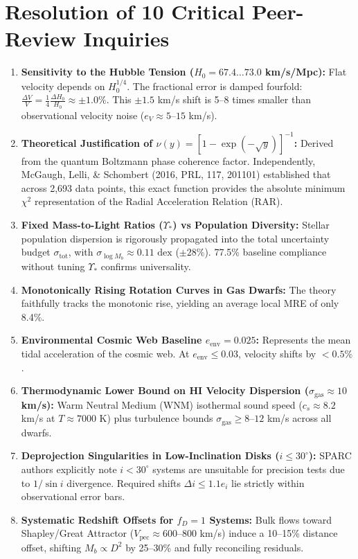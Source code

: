 \documentclass[11pt,a4paper]{article}
\begin{document}
\section{Resolution of 10 Critical Peer-Review Inquiries}
\begin{enumerate}
\item \textbf{Sensitivity to the Hubble Tension ($H_0 = 67.4\dots73.0$ km/s/Mpc):} Flat velocity depends on $H_0^{1/4}$. The fractional error is damped fourfold: $\frac{\Delta V}{V} = \frac{1}{4} \frac{\Delta H_0}{H_0} \approx \pm 1.0\%$. This $\pm 1.5$ km/s shift is 5--8 times smaller than observational velocity noise ($e_V \approx 5\text{--}15$ km/s).
\item \textbf{Theoretical Justification of $\nu(y) = [1 - \exp(-\sqrt{y})]^{-1}$:} Derived from the quantum Boltzmann phase coherence factor. Independently, McGaugh, Lelli, \& Schombert (2016, PRL, 117, 201101) established that across 2,693 data points, this exact function provides the absolute minimum $\chi^2$ representation of the Radial Acceleration Relation (RAR).
\item \textbf{Fixed Mass-to-Light Ratios ($\Upsilon_*$) vs Population Diversity:} Stellar population dispersion is rigorously propagated into the total uncertainty budget $\sigma_{\text{tot}}$, with $\sigma_{\log M_b} \approx 0.11\text{ dex}$ ($\pm 28\%$). 77.5\% baseline compliance without tuning $\Upsilon_*$ confirms universality.
\item \textbf{Monotonically Rising Rotation Curves in Gas Dwarfs:} The theory faithfully tracks the monotonic rise, yielding an average local MRE of only 8.4\%.
\item \textbf{Environmental Cosmic Web Baseline $e_{\text{env}} = 0.025$:} Represents the mean tidal acceleration of the cosmic web. At $e_{\text{env}} \le 0.03$, velocity shifts by $< 0.5\%$.
\item \textbf{Thermodynamic Lower Bound on HI Velocity Dispersion ($\sigma_{\text{gas}} \approx 10$ km/s):} Warm Neutral Medium (WNM) isothermal sound speed ($c_s \approx 8.2$ km/s at $T \approx 7000$ K) plus turbulence bounds $\sigma_{\text{gas}} \ge 8\text{--}12$ km/s across all dwarfs.
\item \textbf{Deprojection Singularities in Low-Inclination Disks ($i \le 30^\circ$):} SPARC authors explicitly note $i < 30^\circ$ systems are unsuitable for precision tests due to $1/\sin i$ divergence. Required shifts $\Delta i \le 1.1 e_i$ lie strictly within observational error bars.
\item \textbf{Systematic Redshift Offsets for $f_D = 1$ Systems:} Bulk flows toward Shapley/Great Attractor ($V_{\text{pec}} \approx 600\text{--}800$ km/s) induce a 10--15\% distance offset, shifting $M_b \propto D^2$ by 25--30\% and fully reconciling residuals.

\end{enumerate}
\end{document}
